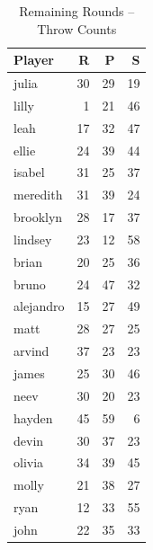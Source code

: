 \documentclass[12pt]{article}
\begin{document}
\begin{multicols}{2}
\begin{table}[H]
\centering
\caption{Remaining Rounds – Throw Counts}
\label{tab:rest_counts}
\begin{tabular}{lrrr}
\toprule
\textbf{Player} & \textbf{R} & \textbf{P} & \textbf{S} \\
\midrule
julia & 30 & 29 & 19 \\
lilly & 1 & 21 & 46 \\
leah & 17 & 32 & 47 \\
ellie & 24 & 39 & 44 \\
isabel & 31 & 25 & 37 \\
meredith & 31 & 39 & 24 \\
brooklyn & 28 & 17 & 37 \\
lindsey & 23 & 12 & 58 \\
brian & 20 & 25 & 36 \\
bruno & 24 & 47 & 32 \\
alejandro & 15 & 27 & 49 \\
matt & 28 & 27 & 25 \\
arvind & 37 & 23 & 23 \\
james & 25 & 30 & 46 \\
neev & 30 & 20 & 23 \\
hayden & 45 & 59 & 6 \\
devin & 30 & 37 & 23 \\
olivia & 34 & 39 & 45 \\
molly & 21 & 38 & 27 \\
ryan & 12 & 33 & 55 \\
john & 22 & 35 & 33 \\
\bottomrule
\end{tabular}
\end{table}


\end{multicols}
\end{document}
